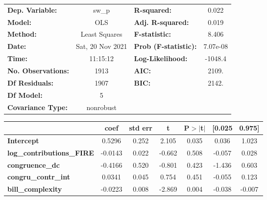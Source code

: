 \begin{center}
\begin{tabular}{lclc}
\toprule
\textbf{Dep. Variable:}           &      sw\_p       & \textbf{  R-squared:         } &     0.022   \\
\textbf{Model:}                   &       OLS        & \textbf{  Adj. R-squared:    } &     0.019   \\
\textbf{Method:}                  &  Least Squares   & \textbf{  F-statistic:       } &     8.406   \\
\textbf{Date:}                    & Sat, 20 Nov 2021 & \textbf{  Prob (F-statistic):} &  7.07e-08   \\
\textbf{Time:}                    &     11:15:12     & \textbf{  Log-Likelihood:    } &   -1048.4   \\
\textbf{No. Observations:}        &        1913      & \textbf{  AIC:               } &     2109.   \\
\textbf{Df Residuals:}            &        1907      & \textbf{  BIC:               } &     2142.   \\
\textbf{Df Model:}                &           5      & \textbf{                     } &             \\
\textbf{Covariance Type:}         &    nonrobust     & \textbf{                     } &             \\
\bottomrule
\end{tabular}
\begin{tabular}{lcccccc}
                                  & \textbf{coef} & \textbf{std err} & \textbf{t} & \textbf{P$> |$t$|$} & \textbf{[0.025} & \textbf{0.975]}  \\
\midrule
\textbf{Intercept}                &       0.5296  &        0.252     &     2.105  &         0.035        &        0.036    &        1.023     \\
\textbf{log\_contributions\_FIRE} &      -0.0143  &        0.022     &    -0.662  &         0.508        &       -0.057    &        0.028     \\
\textbf{congruence\_dc}           &      -0.4166  &        0.520     &    -0.801  &         0.423        &       -1.436    &        0.603     \\
\textbf{congru\_contr\_int}       &       0.0341  &        0.045     &     0.754  &         0.451        &       -0.055    &        0.123     \\
\textbf{bill\_complexity}         &      -0.0223  &        0.008     &    -2.869  &         0.004        &       -0.038    &       -0.007     \\

\end{tabular}
\end{center}
